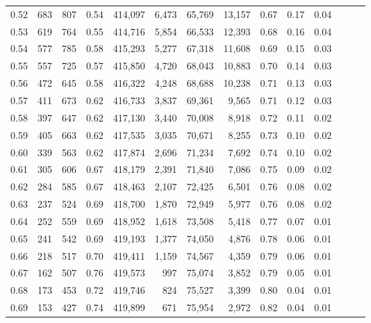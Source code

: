 \begin{tabular}{rrrrrrrrrrrrrr}
0.52 &     683 &    807 &  0.54 &  414,097 &    6,473 &  65,769 &  13,157 &  0.67 &  0.17 &      0.04 \\
0.53 &     619 &    764 &  0.55 &  414,716 &    5,854 &  66,533 &  12,393 &  0.68 &  0.16 &      0.04 \\
0.54 &     577 &    785 &  0.58 &  415,293 &    5,277 &  67,318 &  11,608 &  0.69 &  0.15 &      0.03 \\
0.55 &     557 &    725 &  0.57 &  415,850 &    4,720 &  68,043 &  10,883 &  0.70 &  0.14 &      0.03 \\
0.56 &     472 &    645 &  0.58 &  416,322 &    4,248 &  68,688 &  10,238 &  0.71 &  0.13 &      0.03 \\
0.57 &     411 &    673 &  0.62 &  416,733 &    3,837 &  69,361 &   9,565 &  0.71 &  0.12 &      0.03 \\
0.58 &     397 &    647 &  0.62 &  417,130 &    3,440 &  70,008 &   8,918 &  0.72 &  0.11 &      0.02 \\
0.59 &     405 &    663 &  0.62 &  417,535 &    3,035 &  70,671 &   8,255 &  0.73 &  0.10 &      0.02 \\
0.60 &     339 &    563 &  0.62 &  417,874 &    2,696 &  71,234 &   7,692 &  0.74 &  0.10 &      0.02 \\
0.61 &     305 &    606 &  0.67 &  418,179 &    2,391 &  71,840 &   7,086 &  0.75 &  0.09 &      0.02 \\
0.62 &     284 &    585 &  0.67 &  418,463 &    2,107 &  72,425 &   6,501 &  0.76 &  0.08 &      0.02 \\
0.63 &     237 &    524 &  0.69 &  418,700 &    1,870 &  72,949 &   5,977 &  0.76 &  0.08 &      0.02 \\
0.64 &     252 &    559 &  0.69 &  418,952 &    1,618 &  73,508 &   5,418 &  0.77 &  0.07 &      0.01 \\
0.65 &     241 &    542 &  0.69 &  419,193 &    1,377 &  74,050 &   4,876 &  0.78 &  0.06 &      0.01 \\
0.66 &     218 &    517 &  0.70 &  419,411 &    1,159 &  74,567 &   4,359 &  0.79 &  0.06 &      0.01 \\
0.67 &     162 &    507 &  0.76 &  419,573 &      997 &  75,074 &   3,852 &  0.79 &  0.05 &      0.01 \\
0.68 &     173 &    453 &  0.72 &  419,746 &      824 &  75,527 &   3,399 &  0.80 &  0.04 &      0.01 \\
0.69 &     153 &    427 &  0.74 &  419,899 &      671 &  75,954 &   2,972 &  0.82 &  0.04 &      0.01 \\

\end{tabular}
